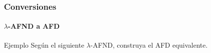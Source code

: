 \documentclass{beamer}
\begin{document}
        \begin{frame}
			\frametitle{Conversiones}
			\framesubtitle{$\lambda$-AFND a AFD}

            \begin{exampleblock}{Ejemplo}
               Seg\'un el siguiente $\lambda$-AFND, construya el AFD equivalente.
               \begin{center}
			   \end{center}
            \end{exampleblock}
		\end{frame}
\end{document}
